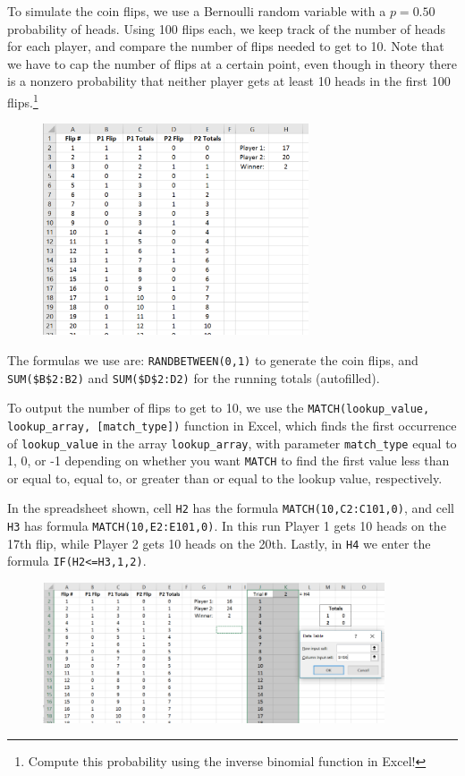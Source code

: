To simulate the coin flips, we use a Bernoulli random variable with a $p = 0.50$ probability of heads.
Using 100 flips each, we keep track of the number of heads for each player, and compare the number of flips needed to get to 10.
Note that we have to cap the number of flips at a certain point, even though in theory there is a nonzero probability that neither player gets at least 10 heads in the first 100 flips.\footnote{Compute this probability using the inverse binomial function in Excel!}

\begin{figure}[htbp]
	\centering
	\includegraphics[width=0.7\textwidth]{fig/3_couch_1.png}
	\label{fig:3_couch_1}
\end{figure}

The formulas we use are: \texttt{RANDBETWEEN(0,1)} to generate the coin flips, and \texttt{SUM(\$B\$2:B2)} and \texttt{SUM(\$D\$2:D2)} for the running totals (autofilled).

To output the number of flips to get to 10, we use the \texttt{MATCH(lookup\_value, lookup\_array, [match\_type])} function in Excel, which finds the first occurrence of \texttt{lookup\_value} in the array \texttt{lookup\_array}, with parameter \texttt{match\_type} equal to 1, 0, or -1 depending on whether you want \texttt{MATCH} to find the first value less than or equal to, equal to, or greater than or equal to the lookup value, respectively.

In the spreadsheet shown, cell \texttt{H2} has the formula \texttt{MATCH(10,C2:C101,0)}, and cell \texttt{H3} has formula \texttt{MATCH(10,E2:E101,0)}.
In this run Player 1 gets 10 heads on the 17th flip, while Player 2 gets 10 heads on the 20th.
Lastly, in \texttt{H4} we enter the formula \texttt{IF(H2<=H3,1,2)}.


\begin{figure}[htbp]
	\centering
	\includegraphics[width=0.9\textwidth]{fig/3_couch_2.png}
	\label{fig:3_couch_2}
\end{figure}

